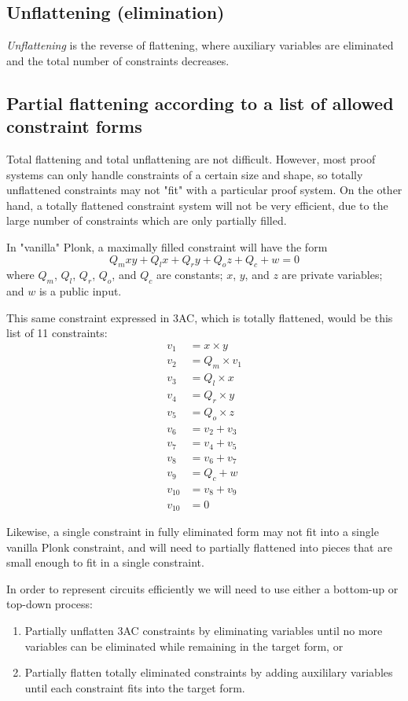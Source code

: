 \documentclass[
    9pt,            %
    techreport,        %
    affiltop,       %
]{art}
\begin{document}
\subsection{Unflattening (elimination)}
\emph{Unflattening} is the reverse of flattening, where auxiliary variables are eliminated and the total number of constraints decreases.

\subsection{Partial flattening according to a list of allowed constraint forms}
Total flattening and total unflattening are not difficult. However, most proof systems can only handle constraints of a certain size and shape, so totally unflattened constraints may not "fit" with a particular proof system. On the other hand, a totally flattened constraint system will not be very efficient, due to the large number of constraints which are only partially filled.

In "vanilla" Plonk, a maximally filled constraint will have the form
$$Q_m x y + Q_l x + Q_r y + Q_o z + Q_c + w = 0$$ where $Q_m$, $Q_l$, $Q_r$, $Q_o$, and $Q_c$ are constants; $x$, $y$, and $z$ are private variables; and $w$ is a public input.

This same constraint expressed in 3AC, which is totally flattened, would be this list of 11 constraints:
\begin{align*}
v_1 &= x\times y\\
v_2 &= Q_m\times v_1\\
v_3 &= Q_l\times x\\
v_4 &= Q_r\times y\\
v_5 &= Q_o\times z\\
v_6 &= v_2 + v_3\\
v_7 &= v_4 + v_5\\
v_8 &= v_6 + v_7\\
v_9 &= Q_c + w\\
v_{10} &= v_8 + v_9\\
v_{10} &= 0
\end{align*}

Likewise, a single constraint in fully eliminated form may not fit into a single vanilla Plonk constraint, and will need to partially flattened into pieces that are small enough to fit in a single constraint.

In order to represent circuits efficiently we will need to use either a bottom-up or top-down process:

\begin{enumerate}
    \item Partially unflatten 3AC constraints by eliminating variables until no more variables can be eliminated while remaining in the target form, or
    \item Partially flatten totally eliminated constraints by adding auxililary variables until each constraint fits into the target form.
\end{enumerate}
\end{document}
